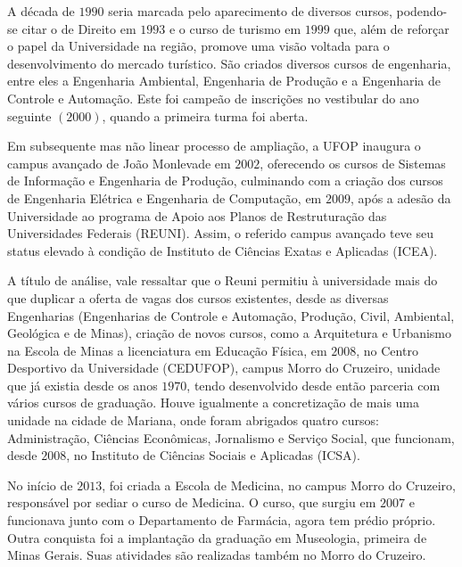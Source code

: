 \documentclass[
	12pt,				%
	openright,			%
	oneside,			%
	a4paper,			%
	english,			%
	brazil				%
	]{abntex2}
\begin{document}
A década de $1990$ seria marcada pelo aparecimento de diversos cursos, podendo-se citar o de Direito em $1993$ e o curso de turismo em $1999$ que, além de reforçar o papel da Universidade na região, promove uma visão voltada para o desenvolvimento do mercado turístico. São criados diversos cursos de engenharia, entre eles a Engenharia Ambiental, Engenharia de Produção e a Engenharia de Controle e Automação. Este foi campeão de inscrições no vestibular do ano seguinte $(2000)$, quando a primeira turma foi aberta.

Em subsequente mas não linear processo de ampliação, a UFOP inaugura o campus avançado de João Monlevade em $2002$, oferecendo os cursos de Sistemas de Informação e Engenharia de Produção, culminando com a criação dos cursos de Engenharia Elétrica e Engenharia de Computação, em $2009$, após a adesão da Universidade ao programa de Apoio aos Planos de Restruturação das Universidades Federais (REUNI). Assim, o referido campus avançado teve seu status elevado à condição de Instituto de Ciências Exatas e Aplicadas (ICEA).

A título de análise, vale ressaltar que o Reuni permitiu à universidade mais do que duplicar a oferta de vagas dos cursos existentes, desde as diversas Engenharias (Engenharias de Controle e Automação, Produção, Civil, Ambiental, Geológica e de Minas), criação de novos cursos, como a Arquitetura e Urbanismo na Escola de Minas a licenciatura em Educação Física, em $2008$, no Centro Desportivo da Universidade (CEDUFOP), campus Morro do Cruzeiro, unidade que já existia desde os anos $1970$, tendo desenvolvido desde então parceria com vários cursos de graduação. Houve igualmente a concretização de mais uma unidade na cidade de Mariana, onde foram abrigados quatro cursos: Administração, Ciências Econômicas, Jornalismo e Serviço Social, que funcionam, desde $2008$, no Instituto de Ciências Sociais e Aplicadas (ICSA).

No início de $2013$, foi criada a Escola de Medicina, no campus Morro do Cruzeiro, responsável por sediar o curso de Medicina. O curso, que surgiu em $2007$ e funcionava junto com o Departamento de Farmácia, agora tem prédio próprio. Outra conquista foi a implantação da graduação em Museologia, primeira de Minas Gerais. Suas atividades são realizadas também no Morro do Cruzeiro.
%
\end{document}
